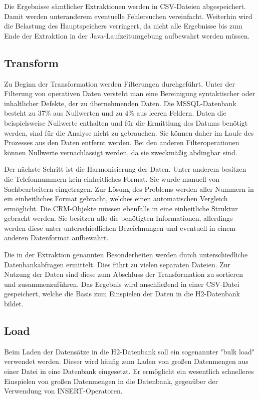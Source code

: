 Die Ergebnisse sämtlicher Extraktionen werden in CSV-Dateien abgespeichert. Damit werden unteranderem eventuelle Fehlersuchen vereinfacht. Weiterhin wird die Belastung des Hauptspeichers verringert, da nicht alle Ergebnisse bis zum Ende der Extraktion in der Java-Laufzeitumgebung aufbewahrt werden müssen.

\subsection{Transform}

Zu Beginn der Transformation werden Filterungen durchgeführt. Unter der Filterung von operativen Daten versteht man eine Bereinigung syntaktischer oder inhaltlicher Defekte, der zu übernehmenden Daten. Die MSSQL-Datenbank besteht zu 37\% aus Nullwerten und zu 4\% aus leeren Feldern. Daten die beispielsweise Nullwerte enthalten und für die Ermittlung des Datums benötigt werden, sind für die Analyse nicht zu gebrauchen. Sie können daher im Laufe des Prozesses aus den Daten entfernt werden. Bei den anderen Filteroperationen können Nullwerte vernachlässigt werden, da sie zweckmäßig abdingbar sind.

Der nächste Schritt ist die Harmonisierung der Daten. Unter anderem besitzen die Telefonnummern kein einheitliches Format. Sie wurde manuell von Sachbearbeitern eingetragen. Zur Lösung des Problems werden aller Nummern in ein einheitliches Format gebracht, welches einen automatischen Vergleich ermöglicht. Die CRM-Objekte müssen ebenfalls in eine einheitliche Struktur gebracht werden. Sie besitzen alle die benötigten Informationen, allerdings werden diese unter unterschiedlichen Bezeichnungen und eventuell in einem anderen Datenformat aufbewahrt.

Die in der Extraktion genannten Besonderheiten werden durch unterschiedliche Datenbankabfragen ermittelt. Dies führt zu vielen separaten Dateien. Zur Nutzung der Daten sind diese zum Abschluss der Transformation zu sortieren und zusammenzuführen. Das Ergebnis wird anschließend in einer CSV-Datei gespeichert, welche die Basis zum Einspielen der Daten in die H2-Datenbank bildet. 

\subsection{Load}

Beim Laden der Datensätze in die H2-Datenbank soll ein sogenannter "bulk load" verwendet werden. Dieser wird häufig zum Laden von großen Datenmengen aus einer Datei in eine Datenbank eingesetzt. Er ermöglicht ein wesentlich schnelleres Einspielen von großen Datenmengen in die Datenbank, gegenüber der Verwendung von INSERT-Operatoren.

